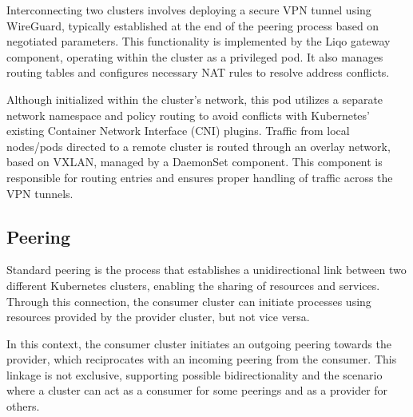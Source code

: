 Interconnecting two clusters involves deploying a secure VPN tunnel using WireGuard, typically established at the end of the peering process based on negotiated parameters. This functionality is implemented by the Liqo gateway component, operating within the cluster as a privileged pod. It also manages routing tables and configures necessary NAT rules to resolve address conflicts. 

Although initialized within the cluster's network, this pod utilizes a separate network namespace and policy routing to avoid conflicts with Kubernetes' existing Container Network Interface (CNI) plugins. Traffic from local nodes/pods directed to a remote cluster is routed through an overlay network, based on VXLAN, managed by a DaemonSet component. This component is responsible for routing entries and ensures proper handling of traffic across the VPN tunnels.

\subsection{Peering}
Standard peering is the process that establishes a unidirectional link between two different Kubernetes clusters, enabling the sharing of resources and services. Through this connection, the consumer cluster can initiate processes using resources provided by the provider cluster, but not vice versa. 

In this context, the consumer cluster initiates an outgoing peering towards the provider, which reciprocates with an incoming peering from the consumer. This linkage is not exclusive, supporting possible bidirectionality and the scenario where a cluster can act as a consumer for some peerings and as a provider for others.

